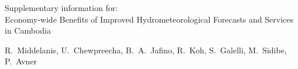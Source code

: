 \documentclass[
  final,
  10pt,
  letterpaper,
  english,
]{article}
\newcommand{\articletitle}{Economy-wide Benefits of Improved Hydrometeorological Forecasts and Services in Cambodia}
\begin{document}
\setcounter{page}{1}
\setcounter{figure}{0}
\setcounter{table}{0}
\addto\captionsenglish{\renewcommand{\figurename}{Supplementary Figure}}
\renewcommand{\figurename}{Supplementary Figure}
\addto\captionsenglish{\renewcommand{\tablename}{Supplementary Table}}
\renewcommand{\tablename}{Supplementary Table}


\newpage
\begin{center}
  { \Large
    \noindent
    Supplementary information for: \\ \vspace{1em}
    \articletitle
  }
    

  {
    \noindent
    {
    \noindent
    R.~Middelanis,
    U.~Chewpreecha,
    B.~A.~Jafino,
    R.~Koh,
    S.~Galelli,
    M.~Sidibe,
    P.~Avner
  }
  }
\end{center}

\vspace{3em}
\end{document}
